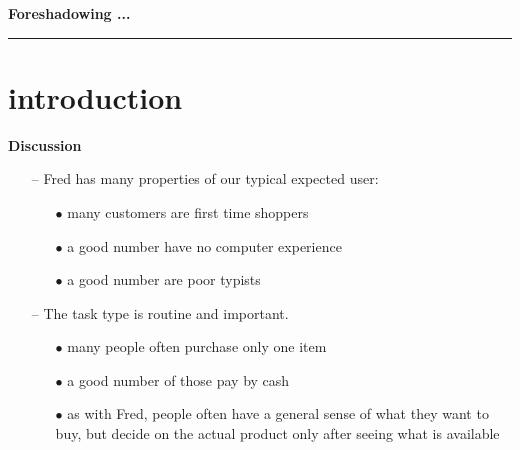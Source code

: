 \documentclass[pdf]{beamer}
\begin{document}
\begin{frame}
\vspace{8mm}
\textcolor{myBlue}{\textbf{\Large{Foreshadowing ...}}}

\textcolor{red}{\rule{10cm}{1mm}}	

     \section{introduction}
     \textbf{Discussion}
     \bigskip
	 \begin{itemize}
        \item[\textcolor{black}{--}] Fred has many properties of our typical expected user:
		\begin{itemize}
            \item[{$\bullet$}]many customers are first time shoppers
			\item[{$\bullet$}]a good number have no computer experience
            \item[{$\bullet$}]a good number are poor typists
		\end{itemize}
        \bigskip
        \item[\textcolor{black}{--}] The task type is routine and important.
        \begin{itemize}
            \item[{$\bullet$}]many people often purchase only one item
			\item[{$\bullet$}]a good number of those pay by cash
            \item[{$\bullet$}]as with Fred, people often have a general sense of what they want to buy, but decide on the actual product only after seeing what is available
		\end{itemize}
     \end{itemize}
        
\end{frame}
\end{document}
